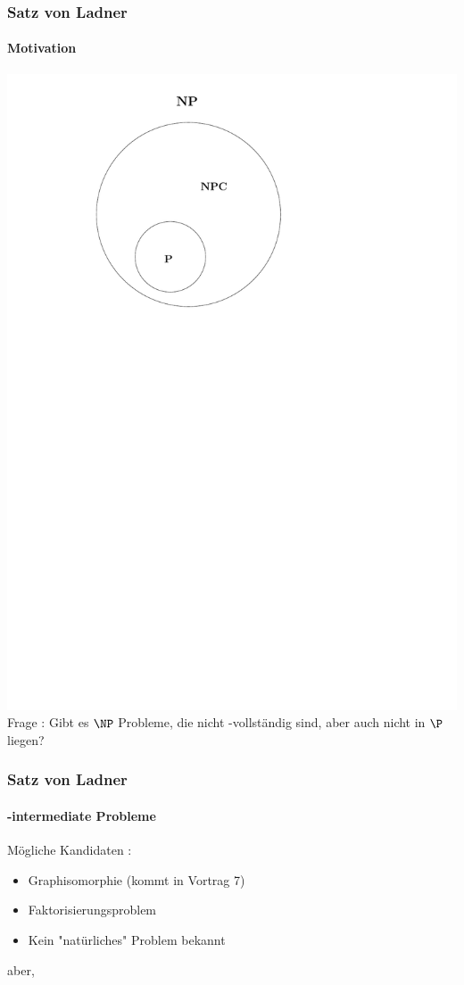 \begin{frame}
	\frametitle{Satz von Ladner}
	\framesubtitle{Motivation}
	\includegraphics[page = 2,scale = 0.6]{images/npi.pdf}
	Frage : Gibt es $\NP$  Probleme, die nicht \NP -vollständig sind, aber auch
	nicht in $\P$  liegen?
\end{frame}
\begin{frame}
	\frametitle{Satz von Ladner}
	\framesubtitle{\NP -intermediate Probleme}
	Mögliche Kandidaten :
	\begin{itemize}
	\item Graphisomorphie (kommt in Vortrag 7)
	\item Faktorisierungsproblem
	\item Kein "natürliches" Problem bekannt
	\end{itemize}
	
	aber,
\end{frame}

